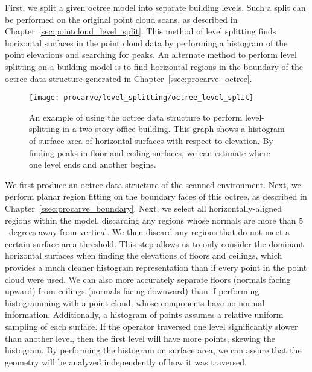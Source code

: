 \documentclass[12pt,onecolumn,oneside]{book}
\begin{document}
First, we split a given octree model into separate building levels.  Such a split can be performed on the original point cloud scans, as described in Chapter~\ref{sec:pointcloud_level_split}.  This method of level splitting finds horizontal surfaces in the point cloud data by performing a histogram of the point elevations and searching for peaks.  An alternate method to perform level splitting on a building model is to find horizontal regions in the boundary of the octree data structure generated in Chapter~\ref{ssec:procarve_octree}.  

\begin{figure}[t]
	\centerline{\texttt{[image: procarve/level\_splitting/octree\_level\_split]}}

	\caption[Using octree to find levels of two-story dataset.]{An example of using the octree data structure to perform level-splitting in a two-story office building.  This graph shows a histogram of surface area of horizontal surfaces with respect to elevation.  By finding peaks in floor and ceiling surfaces, we can estimate where one level ends and another begins.}
	\label{fig:octree_level_split}
\end{figure}

We first produce an octree data structure of the scanned environment.  Next, we perform planar region fitting on the boundary faces of this octree, as described in Chapter~\ref{ssec:procarve_boundary}.  Next, we select all horizontally-aligned regions within the model, discarding any regions whose normals are more than $5$~degrees away from vertical.  We then discard any regions that do not meet a certain surface area threshold.  This step allows us to only consider the dominant horizontal surfaces when finding the elevations of floors and ceilings, which provides a much cleaner histogram representation than if every point in the point cloud were used.  We can also more accurately separate floors (normals facing upward) from ceilings (normals facing downward) than if performing histogramming with a point cloud, whose components have no normal information.  Additionally, a histogram of points assumes a relative uniform sampling of each surface.  If the operator traversed one level significantly slower than another level, then the first level will have more points, skewing the histogram.  By performing the histogram on surface area, we can assure that the geometry will be analyzed independently of how it was traversed.
\end{document}
